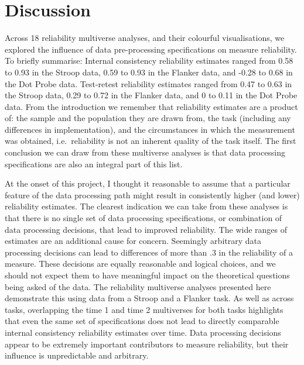 \documentclass[
  english,
  man,floatsintext]{apa6}
\begin{document}
\hypertarget{discussion}{%
\section{Discussion}\label{discussion}}

Across 18 reliability multiverse analyses, and their colourful visualisations, we explored the influence of data pre-processing specifications on measure reliability. To briefly summarise: Internal consistency reliability estimates ranged from 0.58 to 0.93 in the Stroop data, 0.59 to 0.93 in the Flanker data, and -0.28 to 0.68 in the Dot Probe data. Test-retest reliability estimates ranged from 0.47 to 0.63 in the Stroop data, 0.29 to 0.72 in the Flanker data, and 0 to 0.11 in the Dot Probe data. From the introduction we remember that reliability estimates are a product of: the sample and the population they are drawn from, the task (including any differences in implementation), and the circumstances in which the measurement was obtained, i.e.~reliability is not an inherent quality of the task itself. The first conclusion we can draw from these multiverse analyses is that data processing specifications are also an integral part of this list.

At the onset of this project, I thought it reasonable to assume that a particular feature of the data processing path might result in consistently higher (and lower) reliability estimates. The clearest indication we can take from these analyses is that there is no single set of data processing specifications, or combination of data processing decisions, that lead to improved reliability. The wide ranges of estimates are an additional cause for concern. Seemingly arbitrary data processing decisions can lead to differences of more than .3 in the reliability of a measure. These decisions are equally reasonable and logical choices, and we should not expect them to have meaningful impact on the theoretical questions being asked of the data. The reliability multiverse analyses presented here demonstrate this using data from a Stroop and a Flanker task. As well as across tasks, overlapping the time 1 and time 2 multiverses for both tasks highlights that even the same set of specifications does not lead to directly comparable internal consistency reliability estimates over time. Data processing decisions appear to be extremely important contributors to measure reliability, but their influence is unpredictable and arbitrary.
\end{document}
